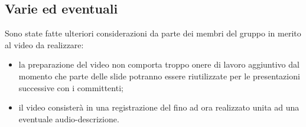 	\subsection*{Varie ed eventuali}
		Sono state fatte ulteriori considerazioni da parte dei membri del gruppo in merito al video da realizzare:
		\begin{itemize}
			\item la preparazione del video non comporta troppo onere di lavoro aggiuntivo dal momento che parte delle slide potranno essere riutilizzate per le presentazioni successive con i committenti;
			\item il video consisterà in una registrazione del  fino ad ora realizzato unita ad una eventuale audio-descrizione.
		\end{itemize}
